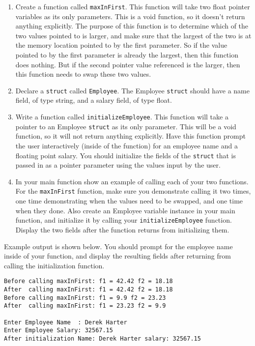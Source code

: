 \documentclass[11pt]{article}
\begin{document}
\begin{enumerate}
\item Create a function called \verb~maxInFirst~.  This function will take two
   float pointer variables as its only parameters.  This is a void
   function, so it doesn't return anything explicitly.  The purpose of
   this function is to determine which of the two values pointed to is
   larger, and make sure that the largest of the two is at the memory
   location pointed to by the first parameter.  So if the value
   pointed to by the first parameter is already the largest, then this
   function does nothing.  But if the second pointer value referenced
   is the larger, then this function needs to swap these two values.
\item Declare a \verb~struct~ called \verb~Employee~.  The Employee \verb~struct~ should
   have a name field, of type string, and a salary field, of type
   float.
\item Write a function called \verb~initializeEmployee~.  This function
   will take a pointer to an Employee \verb~struct~ as its only parameter.
   This will be a void function, so it will not return anything
   explicitly.  Have this function prompt the user interactively
   (inside of the function) for an employee name and a floating
   point salary.  You should initialize the fields of the \verb~struct~
   that is passed in as a pointer parameter using the values
   input by the user.
\item In your main function show an example of calling each of your two 
   functions.  For the \verb~maxInFirst~ function, make sure you demonstrate
   calling it two times, one time demonstrating when the values need
   to be swapped, and one time when they done.  Also create an
   Employee variable instance in your main function, and initialize it
   by calling your \verb~initializeEmployee~ function.  Display the two
   fields after the function returns from initializing them.
\end{enumerate}

Example output is shown below.  You should prompt for the employee
name inside of your function, and display the resulting fields after
returning from calling the initialization function.



\begin{verbatim}
Before calling maxInFirst: f1 = 42.42 f2 = 18.18
After  calling maxInFirst: f1 = 42.42 f2 = 18.18
Before calling maxInFirst: f1 = 9.9 f2 = 23.23
After  calling maxInFirst: f1 = 23.23 f2 = 9.9

Enter Employee Name  : Derek Harter
Enter Employee Salary: 32567.15
After initialization Name: Derek Harter salary: 32567.15
\end{verbatim}
\end{document}
